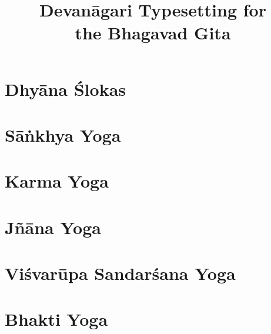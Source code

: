 \documentclass{scrbook}
\title{Devanāgari Typesetting for \\ the Bhagavad Gita}
\author{}
\begin{document}
\maketitle
\frontmatter

\tableofcontents
\newpage

\chapter{Dhyāna Ślokas}


\mainmatter
\setcounter{chapter}{1}

\chapter{Sāṅkhya Yoga}
\begin{multicols}{2}
    
\end{multicols}

\chapter{Karma Yoga}
\begin{multicols}{2}
    
\end{multicols}

\chapter{Jñāna Yoga}
\begin{multicols}{2}
    
\end{multicols}

\setcounter{chapter}{10}

\chapter{Viśvarūpa Sandarśana Yoga}
\begin{multicols}{2}
    
\end{multicols}

\chapter{Bhakti Yoga}
\begin{multicols}{2}
    
\end{multicols}
\end{document}
